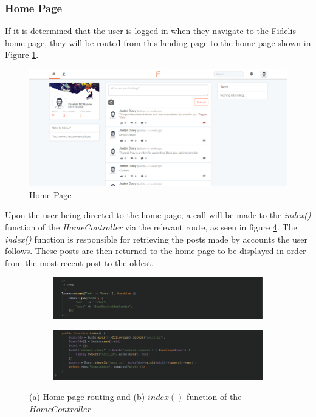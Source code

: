 \subsubsection{Home Page}
If it is determined that the user is logged in when they navigate to the Fidelis home page, they will be routed from this landing page to the home page shown in Figure \ref{fig:HomeAuthorised}.

\begin{figure}[H]
\centering
\includegraphics[width=\textwidth]{Images/Implementation/home_authorised}
\caption{Home Page}
\label{fig:HomeAuthorised}
\end{figure}

Upon the user being directed to the home page, a call will be made to the \textit{index()} function of the \textit{HomeController} via the relevant route, as seen in figure \ref{fig:HomeRoutingController}. The \textit{index()} function is responsible for retrieving the posts made by accounts the user follows. These posts are then returned to the home page to be displayed in order from the most recent post to the oldest.

\begin{figure}[H]
\centering
\begin{subfigure}[b]{1\linewidth}
	\includegraphics[width=\textwidth]{Images/Implementation/HomeRouting}
	\caption{}
	\label{fig:HomeRouting}
\end{subfigure}
\begin{subfigure}[b]{1\linewidth}
	\includegraphics[width=1\textwidth]{Images/Implementation/HomeControllerIndexFunction}
	\caption{}
	\label{fig:HomeControllerIndexFunction}
\end{subfigure}
\caption{(a) Home page routing and (b) $index()$ function of the $HomeController$}
\label{fig:HomeRoutingController}
\end{figure}

